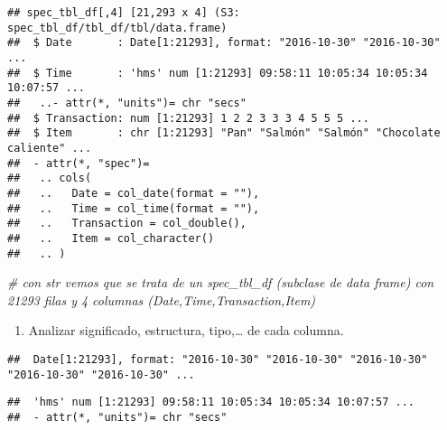 \documentclass[
]{book}
\newenvironment{Shaded}{\begin{snugshade}}{\end{snugshade}}
\newcommand{\CommentTok}[1]{\textcolor[rgb]{0.56,0.35,0.01}{\textit{#1}}}
\newcommand{\FunctionTok}[1]{\textcolor[rgb]{0.00,0.00,0.00}{#1}}
\newcommand{\NormalTok}[1]{#1}
\newcommand{\SpecialCharTok}[1]{\textcolor[rgb]{0.00,0.00,0.00}{#1}}
\providecommand{\tightlist}{%
  \setlength{\itemsep}{0pt}\setlength{\parskip}{0pt}}
\begin{document}
\begin{verbatim}
## spec_tbl_df[,4] [21,293 x 4] (S3: spec_tbl_df/tbl_df/tbl/data.frame)
##  $ Date       : Date[1:21293], format: "2016-10-30" "2016-10-30" ...
##  $ Time       : 'hms' num [1:21293] 09:58:11 10:05:34 10:05:34 10:07:57 ...
##   ..- attr(*, "units")= chr "secs"
##  $ Transaction: num [1:21293] 1 2 2 3 3 3 4 5 5 5 ...
##  $ Item       : chr [1:21293] "Pan" "Salmón" "Salmón" "Chocolate caliente" ...
##  - attr(*, "spec")=
##   .. cols(
##   ..   Date = col_date(format = ""),
##   ..   Time = col_time(format = ""),
##   ..   Transaction = col_double(),
##   ..   Item = col_character()
##   .. )
\end{verbatim}

\begin{Shaded}
\begin{Highlighting}[]
\CommentTok{\# con str vemos que se trata de un spec\_tbl\_df (subclase de data frame) con 21293 filas y 4 columnas (Date,Time,Transaction,Item)}
\end{Highlighting}
\end{Shaded}

\begin{enumerate}
\def\labelenumi{\arabic{enumi}.}
\setcounter{enumi}{2}
\tightlist
\item
  Analizar significado, estructura, tipo,\ldots{} de cada columna.
\end{enumerate}

\begin{Shaded}
\end{Shaded}

\begin{verbatim}
##  Date[1:21293], format: "2016-10-30" "2016-10-30" "2016-10-30" "2016-10-30" "2016-10-30" ...
\end{verbatim}

\begin{Shaded}
\end{Shaded}

\begin{verbatim}
##  'hms' num [1:21293] 09:58:11 10:05:34 10:05:34 10:07:57 ...
##  - attr(*, "units")= chr "secs"
\end{verbatim}
\end{document}
